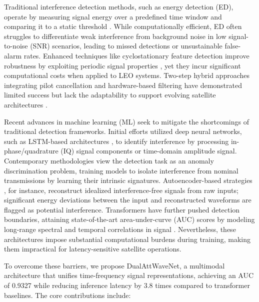 \documentclass[10pt, conference]{IEEEtran}
\begin{document}
Traditional interference detection methods, such as energy detection (ED), operate by measuring signal energy over a predefined time window and comparing it to a static threshold \cite{kay2009fundamentals}. While computationally efficient, ED often struggles to differentiate weak interference from background noise in low signal-to-noise (SNR) scenarios, leading to missed detections or unsustainable false-alarm rates. Enhanced techniques like cyclostationary feature detection improve robustness by exploiting periodic signal properties \cite{experimentalCyclostationary}, yet they incur significant computational costs when applied to LEO systems. Two-step hybrid approaches integrating pilot cancellation and hardware-based filtering have demonstrated limited success but lack the adaptability to support evolving satellite architectures \cite{wangCoFrequencyInterferenceAnalysis2020}.

Recent advances in machine learning (ML) seek to mitigate the shortcomings of traditional detection frameworks. Initial efforts utilized deep neural networks, such as  LSTM-based architectures \cite{pellacoSpectrumPredictionInterference2019}, to identify interference by processing in-phase/quadrature (IQ) signal components or time-domain amplitude signal. Contemporary methodologies view the detection task as an anomaly discrimination problem, training models to isolate interference from nominal transmissions by learning their intrinsic signatures. Autoencoder-based strategies \cite{saifaldawlaConvolutionalAutoencodersNonGeostationary2024}, for instance, reconstruct idealized interference-free signals from raw inputs; significant energy deviations between the input and reconstructed waveforms are flagged as potential interference. Transformers have further pushed detection boundaries, attaining state-of-the-art area-under-curve (AUC) scores by modeling long-range spectral and temporal correlations in signal \cite{saifaldawlaGenAIBasedModelsNGSO2024}. Nevertheless, these architectures impose substantial computational burdens during training, making them impractical for latency-sensitive satellite operations.

To overcome these barriers, we propose DualAttWaveNet, a multimodal architecture that unifies time-frequency signal representations, achieving an AUC of 0.9327 while reducing inference latency by 3.8 times compared to transformer baselines. The core contributions include:
\end{document}
